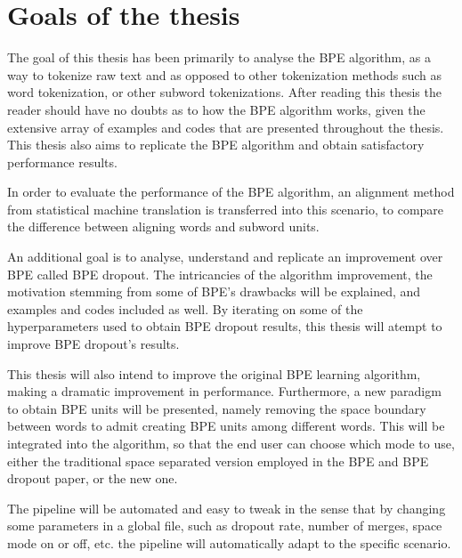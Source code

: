 %
%

\chapter{Goals of the thesis}

The goal of this thesis has been primarily to analyse the BPE algorithm, as a way to tokenize raw text and as opposed to other tokenization methods such as word tokenization, or other subword tokenizations. After reading this thesis the reader should have no doubts as to how the BPE algorithm works, given the extensive array of examples and codes that are presented throughout the thesis. This thesis also aims to replicate the BPE algorithm and obtain satisfactory performance results.

In order to evaluate the performance of the BPE algorithm, an alignment method from statistical machine translation is transferred into this scenario, to compare the difference between aligning words and subword units.

An additional goal is to analyse, understand and replicate an improvement over BPE called BPE dropout. The intricancies of the algorithm improvement, the motivation stemming from some of BPE's drawbacks will be explained, and examples and codes included as well. By iterating on some of the hyperparameters used to obtain BPE dropout results, this thesis will atempt to improve BPE dropout's results.

This thesis will also intend to improve the original BPE learning algorithm, making a dramatic improvement in performance. Furthermore, a new paradigm to obtain BPE units will be presented, namely removing the space boundary between words to admit creating BPE units among different words. This will be integrated into the algorithm, so that the end user can choose which mode to use, either the traditional space separated version employed in the BPE and BPE dropout paper, or the new one. 

The pipeline will be automated and easy to tweak in the sense that by changing some parameters in a global file, such as dropout rate, number of merges, space mode on or off, etc. the pipeline will automatically adapt to the specific scenario.